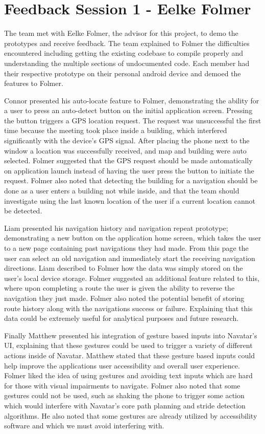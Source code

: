 \documentclass{scrreprt}
\begin{document}
\section{Feedback Session 1 - Eelke Folmer}

The team met with Eelke Folmer, the advisor for this project, to demo the prototypes and receive feedback. The team explained to Folmer the difficulties encountered including getting the existing codebase to compile properly and understanding the multiple sections of undocumented code. Each member had their respective prototype on their personal android device and demoed the features to Folmer. 

Connor presented his auto-locate feature to Folmer, demonstrating the ability for a user to press an auto-detect button on the initial application screen. Pressing the button triggers a GPS location request. The request was unsuccessful the first time because the meeting took place inside a building, which interfered significantly with the device’s GPS signal. After placing the phone next to the window a location was successfully received, and map and building were auto selected. Folmer suggested that the GPS request should be made automatically on application launch instead of having the user press the button to initiate the request. Folmer also noted that detecting the building for a navigation should be done as a user enters a building not while inside, and that the team should investigate using the last known location of the user if a current location cannot be detected.

	Liam presented his navigation history and navigation repeat prototype; demonstrating a new button on the application home screen, which takes the user to a new page containing past navigations they had made. From this page the user can select an old navigation and immediately start the receiving navigation directions. Liam described to Folmer how the data was simply stored on the user's local device storage. Folmer suggested an additional feature related to this, where upon completing a route the user is given the ability to reverse the navigation they just made. Folmer also noted the potential benefit of storing route history along with the navigations success or failure. Explaining that this data could be extremely useful for analytical purposes and future research.
	
	Finally Matthew presented his integration of gesture based inputs into Navatar’s UI, explaining that these gestures could be used to trigger a variety of different actions inside of Navatar. Matthew stated that these gesture based inputs could help improve the applications user accessibility and overall user experience. Folmer liked the idea of using gestures and avoiding text inputs which are hard for those with visual impairments to navigate. Folmer also noted that some gestures could not be used, such as shaking the phone to trigger some action which would interfere with Navatar’s core path planning and stride detection algorithms. He also noted that some gestures are already utilized by accessibility software and which we must avoid interfering with.
	
\end{document}

